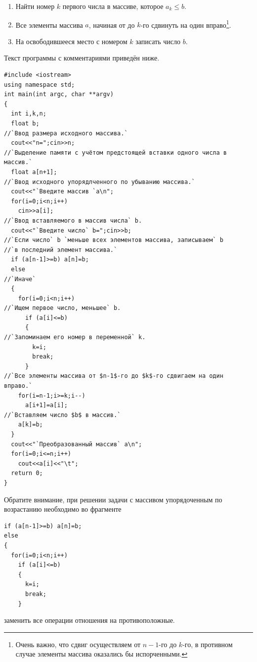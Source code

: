 \begin{enumerate}
\item Найти номер $k$ первого числа в массиве, которое  $a_{k}\le b$.
\item Все элементы массива $a$, начиная от  до $k$-го сдвинуть
на один вправо\footnote{Очень важно, что сдвиг осуществляем от $n-1$-го до $k$-го, в противном случае элементы массива
оказались бы испорченными.}.
\item На освободившееся место с номером $k$ записать число $b$.
\end{enumerate}
Текст программы с комментариями приведён ниже.
\begin{lstlisting}
#include <iostream>
using namespace std;
int main(int argc, char **argv)
{
  int i,k,n;
  float b;
//`Ввод размера исходного массива.`
  cout<<"n=";cin>>n;
//`Выделение памяти с учётом предстоящей вставки одного числа в массив.`
  float a[n+1];
//`Ввод исходного упорядлченного по убыванию массива.`
  cout<<"`Введите массив `a\n";
  for(i=0;i<n;i++)
    cin>>a[i];
//`Ввод вставляемого в массив числа` b.
  cout<<"`Введите число` b=";cin>>b;
//`Если число` b `меньше всех элементов массива, записываем` b
//`в последний элемент массива.`
  if (a[n-1]>=b) a[n]=b;
  else
//`Иначе`
  {
    for(i=0;i<n;i++)
//`Ищем первое число, меньшее` b.
      if (a[i]<=b)
      {
//`Запоминаем его номер в переменной` k.
        k=i;
        break;
      }
//`Все элементы массива от $n-1$-го до $k$-го сдвигаем на один вправо.`
    for(i=n-1;i>=k;i--)
      a[i+1]=a[i];
//`Вставляем число $b$ в массив.`
    a[k]=b;
  }
  cout<<"`Преобразованный массив` a\n";
  for(i=0;i<=n;i++)
    cout<<a[i]<<"\t";
  return 0;
}
\end{lstlisting}

Обратите внимание, при решении задачи с массивом упорядоченным по возрастанию необходимо во фрагменте
\begin{lstlisting}
if (a[n-1]>=b) a[n]=b;
else
{
  for(i=0;i<n;i++)
    if (a[i]<=b)
    {
      k=i;
      break;
    }
\end{lstlisting}
заменить все операции отношения на противоположные.


